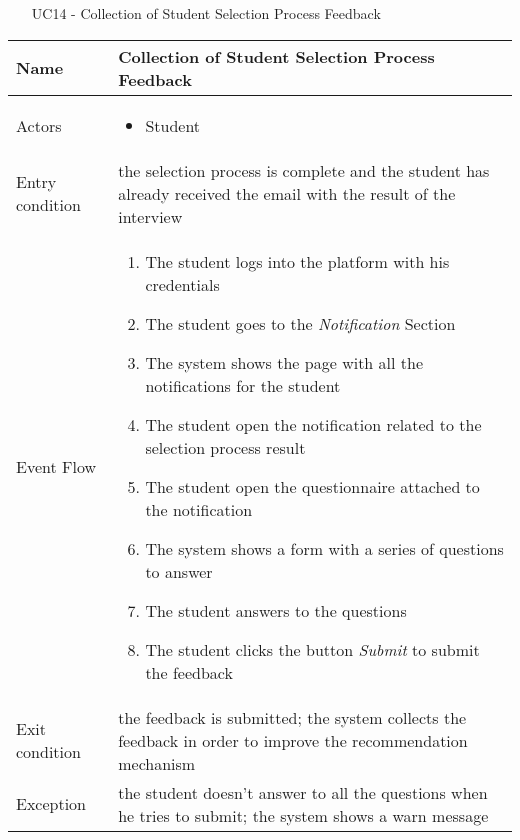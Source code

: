 				
				\begin{table} [H]
					\centering
					\begin{itemize}
						\item [UC14] - Collection of Student Selection Process Feedback
					\end{itemize}
					
					\begin{tabular}{|| P{7.5cm} | P{7.5cm} ||}
						\hline
						Name & Collection of Student Selection Process Feedback \\
						\hline
						Actors & \parbox{5cm}{\begin{itemize}
								\item Student
							\end{itemize}
						} \\
						\hline
						Entry condition & the selection process is complete and the student has already received the email with the result of the interview \\
						\hline
						Event Flow & \parbox{5cm}{\begin{enumerate}
								\item The student logs into the platform with his credentials
								\item The student goes to the \textit{Notification} Section
								\item The system shows the page with all the notifications for the student
								\item The student open the notification related to the selection process result 
								\item The student open the questionnaire attached to the notification
								\item The system shows a form with a series of questions to answer
								\item The student answers to the questions 
								\item The student clicks the button \textit{Submit} to submit the feedback
						\end{enumerate}} \\
						\hline 
						Exit condition & the feedback is submitted; the system collects the feedback in order to improve the recommendation 
						mechanism \\
						\hline
						Exception & the student doesn't answer to all the questions when he tries to submit; the system shows a warn message \\
						\hline
					\end{tabular}
				\end{table}
				
